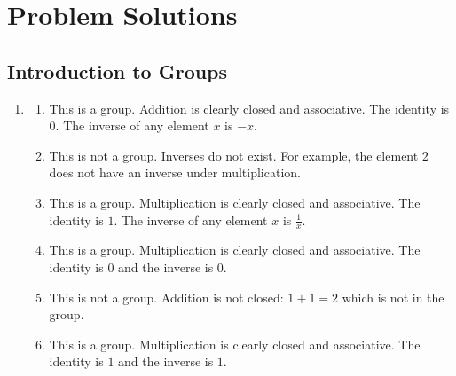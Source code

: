 \chapter{Problem Solutions}

\section{Introduction to Groups}
\begin{enumerate}
    \item \begin{enumerate}[label=(\alph*)]
        \item This is a group. Addition is clearly closed and associative. The identity is 0. The inverse of any element $x$ is $-x$.
        \item This is not a group. Inverses do not exist. For example, the element $2$ does not have an inverse under multiplication.
        \item This is a group. Multiplication is clearly closed and associative. The identity is $1$. The inverse of any element $x$ is $\frac1x$.
        \item This is a group. Multiplication is clearly closed and associative. The identity is $0$ and the inverse is $0$.
        \item This is not a group. Addition is not closed: $1 + 1 = 2$ which is not in the group.
        \item This is a group. Multiplication is clearly closed and associative. The identity is $1$ and the inverse is $1$.
    \end{enumerate}
\end{enumerate}

